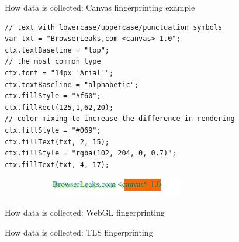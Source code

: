 \begin{frame}[fragile]{How data is collected: Canvas fingerprinting example}
  \begin{verbatim}
// text with lowercase/uppercase/punctuation symbols
var txt = "BrowserLeaks,com <canvas> 1.0";
ctx.textBaseline = "top";
// the most common type
ctx.font = "14px 'Arial'";
ctx.textBaseline = "alphabetic";
ctx.fillStyle = "#f60";
ctx.fillRect(125,1,62,20);
// color mixing to increase the difference in rendering
ctx.fillStyle = "#069";
ctx.fillText(txt, 2, 15);
ctx.fillStyle = "rgba(102, 204, 0, 0.7)";
ctx.fillText(txt, 4, 17);
  \end{verbatim}

  \begin{figure}
    \centering
    \begin{subfigure}{0.45\textwidth}
      \includegraphics[width=\linewidth]{images/canvas.png}
    \end{subfigure}
    \begin{subfigure}{0.45\textwidth}
    \end{subfigure}
  \end{figure}
\end{frame}

\begin{frame}{How data is collected: WebGL fingerprinting}

\end{frame}

\begin{frame}{How data is collected: TLS fingerprinting}

\end{frame}